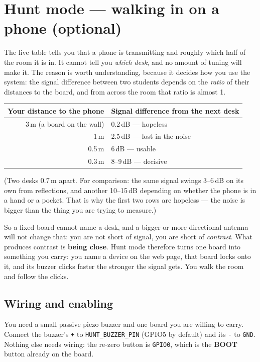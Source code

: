 \documentclass[11pt]{article}
\begin{document}
\section{Hunt mode --- walking in on a phone (optional)}

The live table tells you that a phone is transmitting and roughly which half of
the room it is in. It cannot tell you \emph{which desk}, and no amount of tuning
will make it. The reason is worth understanding, because it decides how you use
the system: the signal difference between two students depends on the
\emph{ratio} of their distances to the board, and from across the room that ratio
is almost 1.

\begin{center}
\begin{tabular}{@{}rl@{}}
\toprule
\textbf{Your distance to the phone} & \textbf{Signal difference from the next desk}\\
\midrule
3\,m (a board on the wall) & 0.2\,dB --- hopeless\\
1\,m                       & 2.5\,dB --- lost in the noise\\
0.5\,m                     & 6\,dB --- usable\\
0.3\,m                     & 8--9\,dB --- decisive\\
\bottomrule
\end{tabular}
\end{center}

(Two desks 0.7\,m apart. For comparison: the same signal swings 3--6\,dB on its
own from reflections, and another 10--15\,dB depending on whether the phone is in
a hand or a pocket. That is why the first two rows are hopeless --- the noise is
bigger than the thing you are trying to measure.)

So a fixed board cannot name a desk, and a bigger or more directional antenna
will not change that: you are not short of signal, you are short of
\emph{contrast}. What produces contrast is \textbf{being close}. Hunt mode
therefore turns one board into something you carry: you name a device on the web
page, that board locks onto it, and its buzzer clicks faster the stronger the
signal gets. You walk the room and follow the clicks.

\subsection*{Wiring and enabling}

You need a small passive piezo buzzer and one board you are willing to carry.
Connect the buzzer's \texttt{+} to \texttt{HUNT\_BUZZER\_PIN} (GPIO5 by default)
and its \texttt{-} to \texttt{GND}. Nothing else needs wiring: the re-zero button
is \texttt{GPIO0}, which is the \textbf{BOOT} button already on the board.
\end{document}
